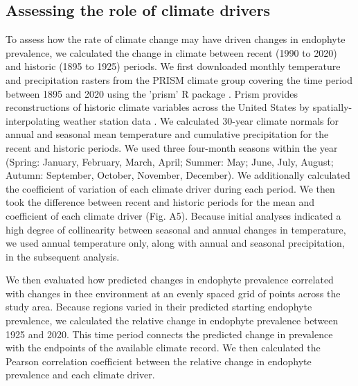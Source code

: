 \documentclass[11pt]{article}
\begin{document}
		\subsection*{Assessing the role of climate drivers}
To assess how the rate of climate change may have driven changes in endophyte prevalence, we calculated the change in climate between recent (1990 to 2020) and historic (1895 to 1925) periods.
We first downloaded monthly temperature and precipitation rasters from the PRISM climate group \citep{daly2013prism} covering the time period between 1895 and 2020 using the 'prism' R package \citep{Rprism2015}. 
Prism provides reconstructions of historic climate variables across the United States by spatially-interpolating weather station data \citep{diLuzio2008constructing}. 
We calculated 30-year climate normals for annual and seasonal mean temperature and cumulative precipitation for the recent and historic periods.
We used three four-month seasons within the year (Spring: January, February, March, April; Summer: May; June, July, August; Autumn: September, October, November, December). 
We additionally calculated the coefficient of variation of each climate driver during each period.
We then took the difference between recent and historic periods for the mean and coefficient of each climate driver (Fig. A5).
Because initial analyses indicated a high degree of collinearity between seasonal and annual changes in temperature, we used annual temperature only, along with annual and seasonal precipitation, in the subsequent analysis.

We then evaluated how predicted changes in endophyte prevalence correlated with changes in thee environment at an evenly spaced grid of points across the study area. 
Because regions varied in their predicted starting endophyte prevalence, we calculated the relative change in endophyte prevalence between 1925 and 2020. 
This time period connects the predicted change in prevalence with the endpoints of the available climate record.
We then calculated the Pearson correlation coefficient between the relative change in endophyte prevalence and each climate driver. 


\end{document}
